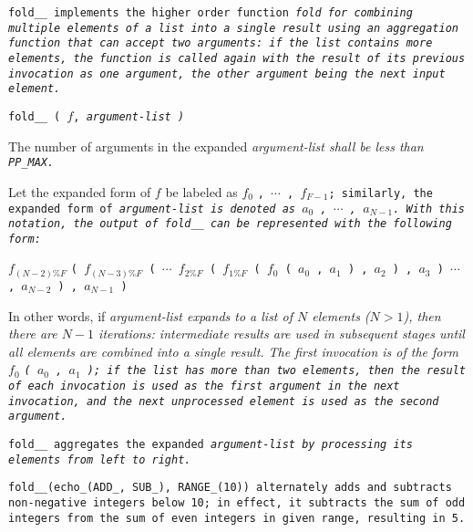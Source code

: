 \tt{fold__} implements the higher order function \it{fold} for combining
multiple elements of a list into a single result using an aggregation
function that can accept two arguments: if the list contains more elements,
the function is called again with the result of its previous invocation
as one argument, the other argument being the next input element.


\tt{fold__ (} $f$, \it{argument-list} \tt{)}


The number of arguments in the expanded
\it{argument-list} shall be less than \tt{PP_MAX}.


Let the expanded form of $f$ be labeled as $f_0$ \tt{,} $\cdots$ \tt{,} $f_{F-1}$;
similarly, the expanded form of \it{argument-list}
is denoted as $a_0$ \tt{,} $\cdots$ \tt{,} $a_{N-1}$.
With this notation, the output of \tt{fold__}
can be represented with the following form:

\centerline
{
$f_{(N - 2)\%F}$ \tt{(} $f_{(N - 3)\%F}$ \tt{(} $\cdots$ $f_{2\%F}$ \tt{(}
$f_{1\%F}$ \tt{(} $f_0$ \tt{(} $a_0$ \tt{,} $a_1$ \tt{) ,} $a_2$ \tt{) ,}
$a_3$ \tt{)} $\cdots$ \tt{,} $a_{N - 2}$ \tt{) ,} $a_{N - 1}$ \tt{)}
}

In other words, if \it{argument-list} expands to a list of $N$ elements
($N > 1$), then there are $N - 1$ iterations: intermediate results are used
in subsequent stages until all elements are combined into a single result.
The first invocation is of the form $f_0$ \tt{(} $a_0$ \tt{,} $a_1$ \tt{)};
if the list has more than two elements, then the result of each
invocation is used as the first argument in the next invocation,
and the next unprocessed element is used as the second argument.

\note \tt{fold__} aggregates the expanded \it{argument-list}
by processing its elements from left to right.

\example \tt{fold__(echo_(ADD_, SUB_), RANGE_(10))} alternately adds and
subtracts non-negative integers below 10; in effect, it subtracts the sum of
odd integers from the sum of even integers in given range, resulting in \tt{5}.
